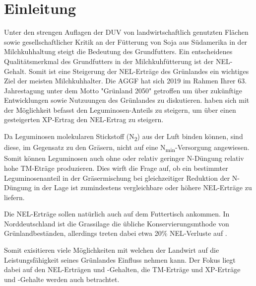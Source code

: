 

\section{Einleitung}
\label{sec:Einleitung}

Unter den strengen Auflagen der \ac{DUV} von landwirtschaftlich genutzten Flächen sowie gesellschaftlicher Kritik an der Fütterung von Soja aus Südamerika in der Milchkuhhaltung steigt die Bedeutung des Grundfutters.
Ein entscheidenes Qualitätsmerkmal des Grundfutters in der Milchkuhfütterung ist der \ac{NEL}-Gehalt.
Somit ist eine Steigerung der \ac{NEL}-Erträge des Grünlandes ein wichtiges Ziel der meisten Milchkuhhalter.
Die \ac{AGGF} hat sich 2019 im Rahmen Ihrer 63. Jahrestagung unter dem Motto "Grünland 2050" \space getroffen um über zukünftige Entwicklungen sowie Nutzuungen des Grünlandes zu diskutieren.
\textcite[33-36]{weggler2050leguminosen} haben sich mit der Möglichkeit befasst den Leguminosen-Anteils zu steigern, um über einen gesteigerten \ac{XP}-Ertrag den \ac{NEL}-Ertrag zu steigern.

Da Leguminosen molekularen Stickstoff (N\textsubscript{2}) aus der Luft binden können, sind diese, im Gegensatz zu den Gräsern, nicht auf eine N\textsubscript{min}-Versorgung angewiesen.
Somit können Leguminosen auch ohne oder relativ geringer N-Düngung relativ hohe \ac{TM}-Eträge produzieren.
Dies wirft die Frage auf, ob ein bestimmter Leguminosenanteil in der Gräsermischung bei gleichzeitiger Reduktion der N-Düngung in der Lage ist zumindestens vergleichbare oder höhere \ac{NEL}-Erträge zu liefern.

Die \ac{NEL}-Erträge sollen natürlich auch auf dem Futtertisch ankommen.
In Norddeutschland ist die Grassilage die übliche Konservierungsmthode von Grünlandbeständen, allerdings treten dabei etwa 20\% \ac{NEL}-Verluste auf \parencite[30]{fritz2018wirtschaftliche}.

Somit exisitieren viele Möglichkeiten mit welchen der Landwirt auf die Leistungsfähigkeit seines Grünlandes Einfluss nehmen kann.
Der Fokus liegt dabei auf den \ac{NEL}-Erträgen und -Gehalten, die \ac{TM}-Erträge und \ac{XP}-Erträge und -Gehalte werden auch betrachtet.


